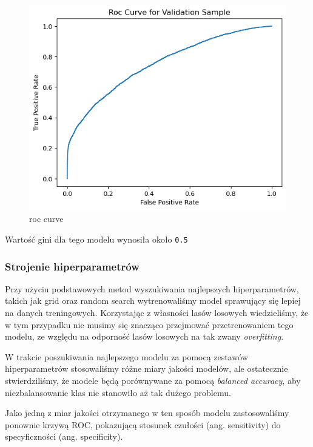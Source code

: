 \documentclass[11pt]{article}
\begin{document}
\begin{figure}
\centering
\includegraphics{plots/RF_base_roc.png}
\caption{roc curve}
\end{figure}

Wartość gini dla tego modelu wynosiła około \texttt{0.5}

\hypertarget{strojenie-hiperparametruxf3w}{%
\subsubsection{Strojenie
hiperparametrów}\label{strojenie-hiperparametruxf3w}}

Przy użyciu podstawowych metod wyszukiwania najlepszych hiperparametrów,
takich jak grid oraz random search wytrenowaliśmy model sprawujący się
lepiej na danych treningowych. Korzystając z własności lasów losowych
wiedzieliśmy, że w tym przypadku nie musimy się znacząco przejmować
przetrenowaniem tego modelu, ze względu na odporność lasów losowych na
tak zwany \emph{overfitting}.

W trakcie poszukiwania najlepszego modelu za pomocą zestawów
hiperparametrów stosowaliśmy różne miary jakości modelów, ale
ostatecznie stwierdziliśmy, że modele będą porównywane za pomocą
\emph{balanced accuracy}, aby niezbalansowanie klas nie stanowiło aż tak
dużego problemu.

Jako jedną z miar jakości otrzymanego w ten sposób modelu zastosowaliśmy
ponownie krzywą ROC, pokazującą stosunek czułości (ang. sensitivity) do
specyficzności (ang. specificity).
\end{document}
